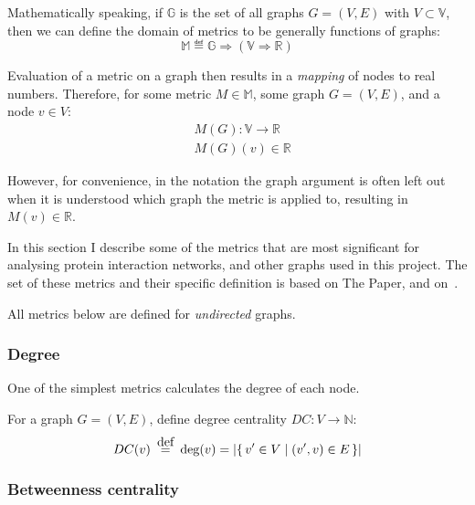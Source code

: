 Mathematically speaking, if $\mathbb{G}$ is the set of all graphs $G = (V, E)$ with $V \subset \mathbb{V}$, then we can define the domain of metrics to be generally functions of graphs:
\begin{equation}
    \label{eqn:metric_type_def}
    \mathbb{M} \eqdef \mathbb{G} \Rightarrow (\mathbb{V} \Rightarrow \mathbb{R})
\end{equation}

Evaluation of a metric on a graph then results in a \textsl{mapping} of nodes to real numbers.
Therefore, for some metric $M \in \mathbb{M}$, some graph $G = (V, E)$, and a node $v \in V$:
\begin{align}
    &M(G) : \mathbb{V} \rightarrow \mathbb{R}\\
    &M(G)(v) \in \mathbb{R}
\end{align}

However, for convenience, in the notation the graph argument is often left out when it is understood which graph the metric is applied to, resulting in $M(v) \in \mathbb{R}$.

\parspace

In this section I describe some of the metrics that are most significant for analysing protein interaction networks, and other graphs used in this project.
The set of these metrics and their specific definition is based on The Paper\cite{Bozhilova2019}, and on~\cite{MartinHernandez2011}.

All metrics below are defined for \textsl{undirected} graphs.

\subsubsection{Degree}

One of the simplest metrics calculates the degree of each node.

\begin{definition}
    For a graph $G = (V, E)$, define degree centrality $DC : V \rightarrow \mathbb{N}$:
    \begin{equation*}
        DC(v) \eqdef \deg(v) = \left\lvert \Set{v' \in V}{(v', v) \in E} \right\rvert
    \end{equation*}
\end{definition}

\subsubsection{Betweenness centrality}

